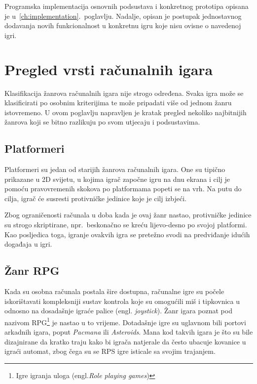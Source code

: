\documentclass[times, utf8, zavrsni, numeric]{fer}
\begin{document}
\par Programska implementacija osnovnih podsustava i konkretnog prototipa opisana je u~\ref{ch:implementation}.~poglavlju.
Nadalje, opisan je postupak jednostavnog dodavanja novih funkcionalnost u konkretnu igru koje nisu ovisne o navedenoj igri.

\chapter{Pregled vrsti računalnih igara}\label{ch:games}

\par Klasifikacija žanrova računalnih igara nije strogo određena.
Svaka igra može se klasificirati po osobnim kriterijima te može pripadati više od jednom žanru istovremeno.
U ovom poglavlju napravljen je kratak pregled nekoliko najbitnijih žanrova koji se bitno razlikuju po svom utjecaju i podsustavima.

\section{Platformeri}

\par Platformeri su jedan od starijih žanrova računalnih igara.
One su tipično prikazane u 2D svijetu, u kojima igrač započne igru na dnu ekrana i cilj je pomoću pravovremenih skokova po platformama popeti se na vrh.
Na putu do cilja, igrač će susresti protivničke jedinice koje je cilj izbjeći.

\par Zbog ograničenosti računala u doba kada je ovaj žanr nastao, protivničke jedinice su strogo skriptirane, npr.\ beskonačno se kreću lijevo-desno po svojoj platformi.
Kao posljedica toga, igranje ovakvih igra se pretežno svodi na predviđanje idućih događaja u igri.

\section{Žanr RPG}

\par Kada su osobna računala postala šire dostupna, računalne igre su počele iskorištavati kompleksniji sustav kontrola koje su omogućili miš i tipkovnica u odnosno na dosadašnje igraće palice (engl. \textit{joystick}).
Žanr igara poznat pod nazivom RPG\footnote{Igre igranja uloga (engl.\textit{Role playing games})} je nastao u to vrijeme.
Dotadašnje igre su uglavnom bili portovi arkadnih igara, poput \textit{Pacmana} ili \textit{Asteroids}.
Mana kod takvih igara je što su bile dizajnirane da kratko traju kako bi igrača natjerale da često ubacuje kovanice u igraći automat, zbog čega su se RPS igre isticale sa svojim trajanjem.
\end{document}
